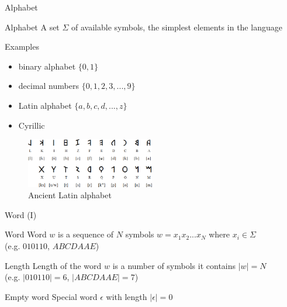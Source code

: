 \documentclass{beamer}
\begin{document}
\begin{frame}{Alphabet}

\begin{block}{Alphabet}
A set $\Sigma$ of available symbols, the simplest elements in the language
\end{block}

\begin{exampleblock}{Examples}
\begin{itemize}
\item binary alphabet $\{0, 1\}$
\item decimal numbers $\{0,1,2,3,...,9\}$
\item Latin alphabet $\{a,b,c,d,...,z\}$
\item Cyrillic
\end{itemize}
\end{exampleblock}

\begin{figure}
\includegraphics[width=0.5\textwidth]{img/latin_archaic.png}
\caption{\label{fig:latin_archaic}Ancient Latin alphabet}
\end{figure}

\end{frame}

\begin{frame}{Word (I)}
\begin{block}{Word}
Word $w$ is a sequence of $N$ symbols $w = x_1x_2...x_N$ where $x_i\in\Sigma$ \\ (e.g. $010110$, $ABCDAAE$)
\end{block}

\begin{block}{Length}
Length of the word $w$ is a number of symbols it contains $|w|=N$ \\ (e.g. $|010110| = 6$, $|ABCDAAE| = 7$)
\end{block}

\begin{alertblock}{Empty word}
Special word $\epsilon$ with length $|\epsilon|=0$
\end{alertblock}

\end{frame}
\end{document}
